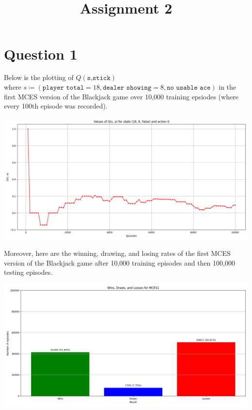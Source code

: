 \documentclass{article}
\title{Assignment 2}
\date{}
\author{}
\begin{document}
\maketitle
\section*{Question 1}
Below is the plotting of $Q(\texttt{s,stick})$\\ 
where $s\coloneq(\texttt{player total} = 18, \texttt{dealer showing} = 8, \texttt{no usable ace})$
in the first MCES version of the Blackjack game over 10,000 training epsiodes (where every 100th episode was recorded).
\begin{center}
    \includegraphics[scale=0.4]{Q_values.png}
\end{center}\par 
Moreover, here are the winning, drawing, and losing rates of the first MCES version of the Blackjack game after 10,000 training episodes and then 100,000 testing episodes.
\begin{center}
    \includegraphics[scale=0.4]{MCES1_Wins_Draws_Losses.png}
\end{center}
\end{document}

